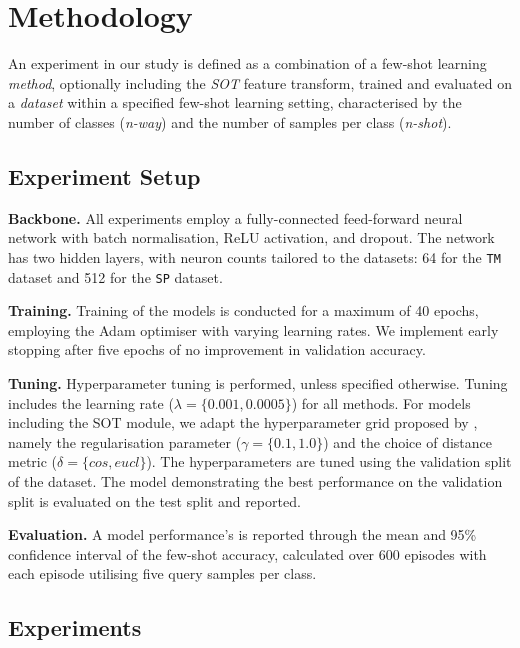 \section{Methodology}

An experiment in our study is defined as a combination of a few-shot learning \textit{method}, optionally including the \textit{SOT} feature transform, trained and evaluated on a \textit{dataset} within a specified few-shot learning setting, characterised by the number of classes (\textit{n-way}) and the number of samples per class (\textit{n-shot}).

\subsection{Experiment Setup}

\textbf{Backbone.} All experiments employ a fully-connected feed-forward neural network with batch normalisation, ReLU activation, and dropout. The network has two hidden layers, with neuron counts tailored to the datasets: 64 for the \texttt{TM} dataset and 512 for the \texttt{SP} dataset.

\textbf{Training.} Training of the models is conducted for a maximum of 40 epochs, employing the Adam optimiser with varying learning rates. We implement early stopping after five epochs of no improvement in validation accuracy. 

\textbf{Tuning.} Hyperparameter tuning is performed, unless specified otherwise. Tuning includes the learning rate ($\lambda = \{0.001, 0.0005\}$) for all methods. For models including the SOT module, we adapt the hyperparameter grid proposed by \citeauthor{sot}, namely the regularisation parameter ($\gamma = \{0.1, 1.0\}$) and the choice of distance metric ($\delta = \{cos, eucl\}$). 
The hyperparameters are tuned using the validation split of the dataset. The model demonstrating the best performance on the validation split is evaluated on the test split and reported.


\textbf{Evaluation.} A model performance's is reported through the mean and 95\% confidence interval of the few-shot accuracy, calculated over 600 episodes with each episode utilising five query samples per class.


\subsection{Experiments}

